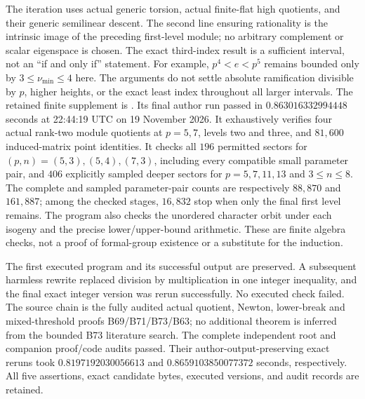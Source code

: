 \begin{remark}
\label{rem:B-RD74-scope}
The iteration uses actual generic torsion, actual finite-flat
high quotients, and their generic semilinear descent. The
second line ensuring rationality is the intrinsic image of
the preceding first-level module; no arbitrary complement
or scalar eigenspace is chosen. The exact third-index result
is a sufficient interval, not an ``if and only if'' statement.
For example, \(p^4<e<p^5\) remains bounded only by
\(3\le\nu_{\min}\le4\) here. The arguments do not settle
absolute ramification divisible by \(p\), higher heights,
or the exact least index throughout all larger intervals.
The retained finite supplement is
.
Its final author run passed in \(0.863016332994448\) seconds
at 22:44:19 UTC on 19 November 2026. It exhaustively verifies
four actual rank-two module quotients at \(p=5,7\), levels
two and three, and \(81{,}600\) induced-matrix point identities.
It checks all \(196\) permitted sectors for
\((p,n)=(5,3),(5,4),(7,3)\), including every compatible small
parameter pair, and \(406\) explicitly sampled deeper sectors
for \(p=5,7,11,13\) and \(3\le n\le8\).
The complete and sampled parameter-pair counts are respectively
\(88{,}870\) and \(161{,}887\); among the checked stages,
\(16{,}832\) stop when only the final first level remains.
The program also checks the unordered character orbit under
each isogeny and the precise lower/upper-bound arithmetic.
These are finite algebra checks, not a proof of formal-group
existence or a substitute for the induction.

The first executed program and its successful output are
preserved. A subsequent harmless rewrite replaced division by
multiplication in one integer inequality, and the final exact
integer version was rerun successfully. No executed check
failed. The source chain is the fully audited actual quotient,
Newton, lower-break and mixed-threshold proofs B69/B71/B73/B63;
no additional theorem is inferred from the bounded B73
literature search.
The complete independent root and companion proof/code audits
passed. Their author-output-preserving exact reruns took
\(0.8197192030056613\) and \(0.8659103850077372\) seconds,
respectively. All five assertions, exact candidate bytes,
executed versions, and audit records are retained.
\end{remark}
